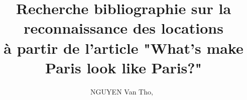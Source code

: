 \documentclass[journal]{IEEEtran}
\begin{document}
%
\title{Recherche bibliographie sur la reconnaissance des locations\\
		  \huge{à partir de l'article "What's make Paris look like Paris?"}}
%
%
%

\author{NGUYEN Van Tho,~}

% 
%



%
{}
% 




\end{document}

